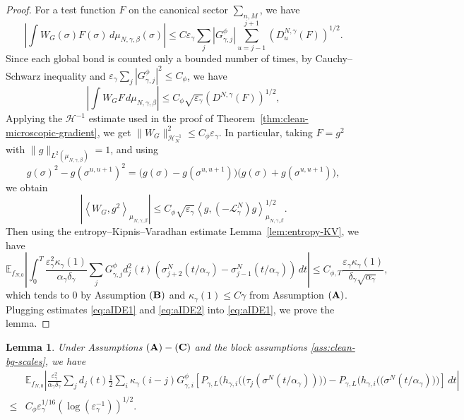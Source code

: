 \documentclass{article}
\newtheorem{lemma}{Lemma}
\begin{document}
\begin{proof}
For a test function \(F\) on the canonical sector $\sum_{n,M}$, we have
\[
\left|
\int W_G(\sigma)F(\sigma)\,d\mu_{N,\gamma,\beta}(\sigma)
\right|
\le
C\varepsilon_\gamma
\sum_j |G_{\gamma,j}^{\phi}|
\sum_{u=j-1}^{j+1}
\left(D_u^{N,\gamma}(F)\right)^{1/2}.
\]
Since each global bond is counted only a bounded number of times, by Cauchy--Schwarz inequality and \(\varepsilon_\gamma\sum_j|G_{\gamma,j}^{\phi}|^2\le C_\phi\), we have
\[
\left|
\int W_G F\,d\mu_{N,\gamma,\beta}
\right| \le C_\phi\sqrt{\varepsilon_\gamma}
\left(D^{N,\gamma}(F)\right)^{1/2},
\]
Applying the \(\mathcal H^{-1}\) estimate used in the proof of Theorem~\ref{thm:clean-microscopic-gradient}, we get
\(\|W_G\|_{\mathcal H_N^{-1}}^2\le C_\phi\varepsilon_\gamma \).
In particular, taking \(F=g^2\) with $\|g\|_{L^2(\mu_{N,\gamma,\beta})}=1$, and using
\[
g(\sigma)^2-g(\sigma^{u,u+1})^2
=
\bigl(g(\sigma)-g(\sigma^{u,u+1})\bigr)
\bigl(g(\sigma)+g(\sigma^{u,u+1})\bigr),
\]
we obtain
\[
\left|
\left\langle W_G,g^2\right\rangle_{\mu_{N,\gamma,\beta}}
\right|
\le
C_\phi\sqrt{\varepsilon_\gamma}
\left\langle g,(-\mathscr L_\gamma^N)g
\right\rangle_{\mu_{N,\gamma,\beta}}^{1/2}.
\]
Then using the entropy--Kipnis--Varadhan estimate Lemma~\ref{lem:entropy-KV}, we have
\begin{equation}\label{eq:aIDE1}
    \mathbb E_{f_{N,0}}
\left|
\int_0^T
\frac{\varepsilon_\gamma^2\kappa_\gamma(1)}{\alpha_\gamma\delta_\gamma}
\sum_j
G_{\gamma,j}^{\phi}d_j^2(t)(\sigma_{j+2}^N(t/\alpha_\gamma)-\sigma_{j-1}^N(t/\alpha_\gamma))\,dt
\right|
\le C_{\phi,T}
\frac{\varepsilon_\gamma\kappa_\gamma(1)}
{\delta_\gamma\sqrt{\alpha_\gamma}},
\end{equation}
which tends to $0$ by Assumption \(({\bf B})\) and
\(\kappa_\gamma(1)\le C\gamma\) from Assumption \(({\bf A})\).
Plugging estimates \eqref{eq:aIDE1} and \eqref{eq:aIDE2} into \eqref{eq:aIDE1}, we prove the lemma.
\end{proof}


\begin{lemma}\label{lem:clean-chain-rule-exchange-variation}
Under Assumptions \(({\bf A})-({\bf C})\)
and the block assumptions \eqref{ass:clean-bg-scales}, we have
\begin{align}
    & \mathbb E_{f_{N,0}}
\left| \frac{\varepsilon_\gamma^2}{\alpha_\gamma\delta_\gamma}
\sum_j d_j(t)\frac12
\sum_i
\kappa_\gamma(i-j)G_{\gamma,i}^{\phi}
\left[ P_{\gamma,L}(h_{\gamma,i}\Big(\bigl(\tau_j(\sigma^N(t/\alpha_\gamma))\bigr)\Big) - P_{\gamma,L}\Big(h_{\gamma,i}(\bigl(\sigma^N(t/\alpha_\gamma)\bigr)\Big)
\right]\,dt \right| \nonumber \\
\le & C_\phi \varepsilon^{1/16}_{\gamma}\left(\log(\varepsilon^{-1}_{\gamma})\right)^{1/2}.
\end{align}
\end{lemma}
\end{document}

